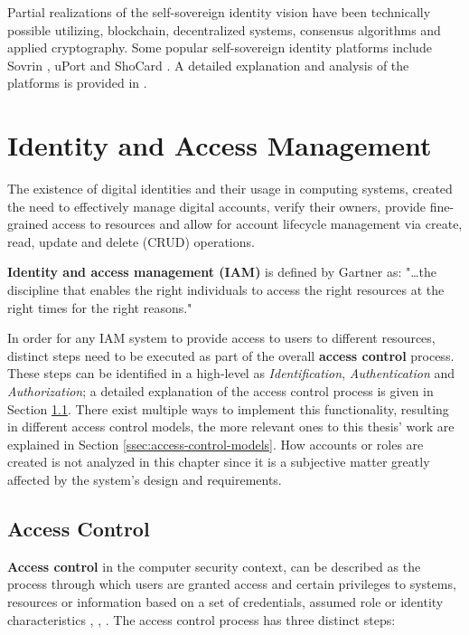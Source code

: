 Partial realizations of the self-sovereign identity vision have been technically possible utilizing, blockchain, decentralized systems, consensus algorithms and applied cryptography. Some popular self-sovereign identity platforms include Sovrin \cite{sovrin-website}, uPort \cite{uport-website} and ShoCard \cite{shocard-website}. A detailed explanation and analysis of the platforms is provided in \cite{ssi-comparison}.


\section{Identity and Access Management} \label{sec:background-iam}

The existence of digital identities and their usage in computing systems, created the need to effectively manage digital accounts, verify their owners, provide fine-grained access to resources and allow for account lifecycle management via create, read, update and delete (CRUD) operations. 

\textbf{Identity and access management (IAM)} is defined by Gartner \cite{iam-definition-gartner} as: \newline
 "\dots the discipline that enables the right individuals to access the right resources at the right times for the right reasons."

In order for any IAM system to provide access to users to different resources, distinct steps need to be executed as part of the overall \textbf{access control} process. These steps can be identified in a high-level as \emph{Identification}, \emph{Authentication} and \emph{Authorization}; a detailed explanation of the access control process is given in Section \ref{ssec:access-control}. There exist multiple ways to implement this functionality, resulting in different access control models, the more relevant ones to this thesis' work are explained in Section \ref{ssec:access-control-models}. How accounts or roles are created is not analyzed in this chapter since it is a subjective matter greatly affected by the system's design and requirements.

\subsection{Access Control} \label{ssec:access-control}

\textbf{Access control} in the computer security context, can be described as the process through which users are granted access and certain privileges to systems, resources or information based on a set of credentials, assumed role or identity characteristics \cite{access-control-definition-techopedia}, \cite{access-control-definition-csoonline}, \cite{access-control-definition-searchsecurity}. The access control process has three distinct steps:

